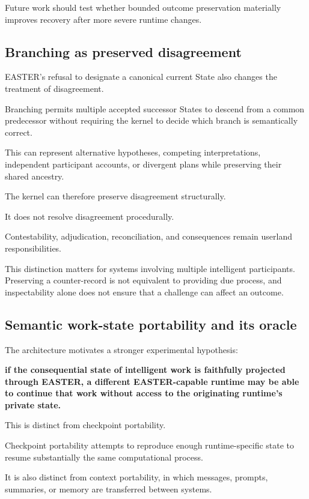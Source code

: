 \documentclass[11pt]{article}
\begin{document}
Future work should test whether bounded outcome preservation materially improves recovery after more severe runtime changes.

\subsection{Branching as preserved disagreement}

EASTER's refusal to designate a canonical current State also changes the treatment of disagreement.

Branching permits multiple accepted successor States to descend from a common predecessor without requiring the kernel to decide which branch is semantically correct.

This can represent alternative hypotheses, competing interpretations, independent participant accounts, or divergent plans while preserving their shared ancestry.

The kernel can therefore preserve disagreement structurally.

It does not resolve disagreement procedurally.

Contestability, adjudication, reconciliation, and consequences remain userland responsibilities.

This distinction matters for systems involving multiple intelligent participants. Preserving a counter-record is not equivalent to providing due process, and inspectability alone does not ensure that a challenge can affect an outcome.

\subsection{Semantic work-state portability and its oracle}

The architecture motivates a stronger experimental hypothesis:

\textbf{if the consequential state of intelligent work is faithfully projected through EASTER, a different EASTER-capable runtime may be able to continue that work without access to the originating runtime's private state.}

This is distinct from checkpoint portability.

Checkpoint portability attempts to reproduce enough runtime-specific state to resume substantially the same computational process.

It is also distinct from context portability, in which messages, prompts, summaries, or memory are transferred between systems.
\end{document}
